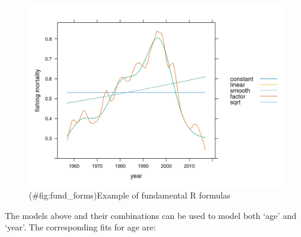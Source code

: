 \documentclass[
]{book}
\begin{document}
\begin{figure}
\centering
\includegraphics{_bookdown_files/_main_files/figure-html/fund_forms-1.png}
\caption{(\#fig:fund\_forms)Example of fundamental R formulas}
\end{figure}

The models above and their combinations can be used to model both `age' and `year'. The corresponding fits for age are:
\end{document}
